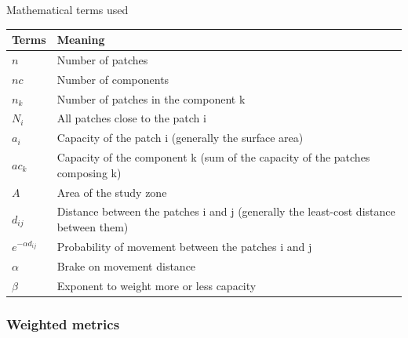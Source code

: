 \documentclass{article}
\begin{document}
\bigskip

Mathematical terms used
\begin{table}[H]
	\begin{tabular}{|m{2cm}|m{13cm}|}
		\hline
		Terms & Meaning\\\hline
		$n$	& Number of patches\\\hline
		$nc$ & Number of components\\\hline
		${n}_{k}$ &	Number of patches in the component k\\\hline
		${N}_{i}$ &	All patches close to the patch i\\\hline
		${a}_{i}$ &	Capacity of the patch i (generally the surface area)\\\hline
		${ac}_{k}$ & Capacity of the component k (sum of the capacity of the patches composing k)\\\hline
		$A$	& Area of the study zone \\\hline
		${d}_{ij}$ & Distance between the patches i and j (generally the least-cost distance between them) \\\hline
		${e}^{-\alpha {d}_{ij}}$ & Probability of movement between the patches i and j\\\hline
		$\alpha$ & Brake on movement distance  \\\hline
		$\beta$	& Exponent to weight more or less capacity\\\hline
	\end{tabular}
\end{table}


\subsubsection{Weighted metrics}
\end{document}
